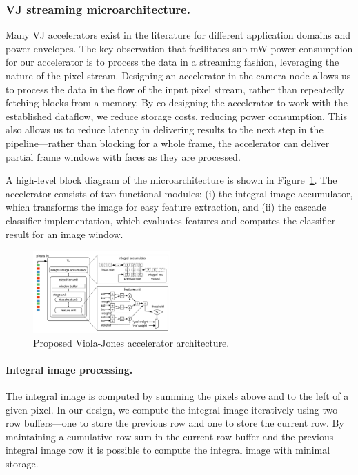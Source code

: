 \subsubsection{VJ streaming microarchitecture.}
Many VJ accelerators exist in the literature for different application domains and power envelopes.
The key observation that facilitates sub-mW power consumption for our accelerator is to process the data in a streaming fashion, leveraging the nature of the pixel stream.
Designing an accelerator in the camera node allows us to process the data in the flow of the input pixel stream, rather than repeatedly fetching blocks from a memory.
By co-designing the accelerator to work with the established dataflow, we reduce storage costs, reducing power consumption.
This also allows us to reduce latency in delivering results to the next step in the pipeline---rather than blocking for a whole frame, the accelerator can deliver partial frame windows with faces as they are processed.

A high-level block diagram of the microarchitecture is shown in Figure~\ref{fig:vj-block}. The accelerator consists of two functional modules: (i) the integral image accumulator, which transforms the image for easy feature extraction, and (ii) the cascade classifier implementation, which evaluates features and computes the classifier result for an image window.

\begin{figure}[h]
\centering
    \begin{center}
      \includegraphics[width=0.47\textwidth]{nsp-figs/vj_arch.pdf}
    \end{center}
    \caption{Proposed Viola-Jones accelerator architecture.}

    \label{fig:vj-block}
\end{figure}

%
\paragraph{Integral image processing.} The integral image is computed by summing the pixels above and to the left of
a given pixel. In our design, we
compute the integral image iteratively using two row buffers---one to store the
previous row and one to store the current row. By maintaining
a cumulative row sum in the current row buffer and the previous integral image row
it is possible to compute the integral image with minimal storage.


